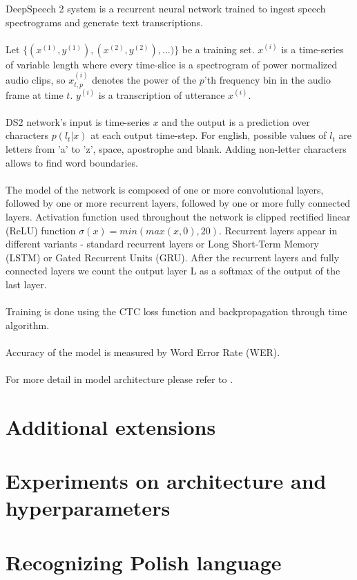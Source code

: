 \documentclass[licencjacka,en]{pracamgr}
\begin{document}
DeepSpeech 2 system is a recurrent neural network trained to ingest speech spectrograms and generate text transcriptions.\\\\
Let $\{(x^{(1)}, y^{(1)}), (x^{(2)}, y^{(2)}), ...)\}$ be a training set. $x^{(i)}$ is a time-series of variable length where every time-slice is a spectrogram of power
normalized audio clips, so $x^{(i)}_{t,p}$ denotes the power of the $p$’th frequency bin in the audio frame at time $t$. $y^{(i)}$ is a transcription of utterance $x^{(i)}$.\\\\
DS2 network's input is time-series $x$ and the output is a prediction over characters $p(l_t|x)$ at each output time-step. For english, possible values of $l_t$ are letters from 'a' to 'z', space, apostrophe and blank. Adding non-letter characters allows to find word boundaries.\\\\
The model of the network is composed of one or more convolutional layers, followed by one or more recurrent layers, followed by one or more fully connected layers. Activation function used throughout the network is clipped rectified linear (ReLU) function $\sigma(x) = min(max(x, 0), 20)$. Recurrent layers appear in different variants - standard recurrent layers or Long Short-Term Memory (LSTM) or Gated Recurrent Units (GRU). After the recurrent layers and fully connected layers we count the output layer L as a softmax of the output of the last layer.\\\\
Training is done using the CTC loss function and backpropagation through time algorithm.\\\\
Accuracy of the model is measured by Word Error Rate (WER).\\\\
For more detail in model architecture please refer to \cite{DS2}.


\chapter{Additional extensions}\label{r:extens}


\chapter{Experiments on architecture and hyperparameters}\label{r:hypers}


\chapter{Recognizing Polish language}\label{r:polish}
\end{document}
